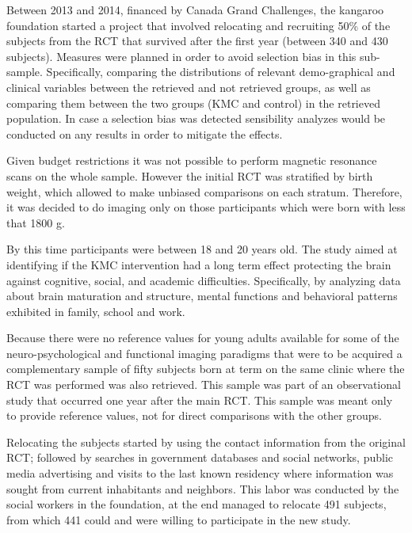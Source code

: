



Between 2013 and 2014, financed by Canada Grand Challenges, the kangaroo foundation started a project that involved relocating and recruiting 50\% of the subjects from the RCT that survived after the first year (between 340 and 430 subjects). Measures were planned in order to avoid selection bias in this sub-sample. Specifically, comparing the distributions of relevant demo-graphical and clinical variables between the retrieved and not retrieved groups, as well as comparing them between the two groups (KMC and control) in the retrieved population. In case a selection bias was detected sensibility analyzes would be conducted on any results in order to mitigate the effects. 

Given budget restrictions it was not possible to perform magnetic resonance scans on the whole sample. However the initial RCT was stratified by birth weight, which allowed to make unbiased comparisons on each stratum. Therefore, it was decided to do imaging only on those participants which were born with less that 1800 g. 

By this time participants were between 18 and 20 years old. The study aimed at identifying if the KMC intervention had a long term effect protecting the brain against cognitive, social, and academic difficulties. Specifically, by analyzing data about brain maturation and structure, mental functions and behavioral patterns exhibited in family, school and work. 

Because there were no reference values for young adults available for some of the neuro-psychological and functional imaging paradigms that were to be acquired a complementary sample of fifty subjects born at term on the same clinic where the RCT was performed was also retrieved. This sample was part of an observational study that occurred one year after the main RCT. This sample was meant only to provide reference values, not for direct comparisons with the other groups.

Relocating the subjects started by using the contact information from the original RCT; followed by searches in government databases and social networks, public media advertising and visits to the last known residency where information was sought from current inhabitants and neighbors. This labor was conducted by the social workers in the foundation, at the end managed to relocate 491 subjects, from which 441 could and were willing to participate in the new study. 


